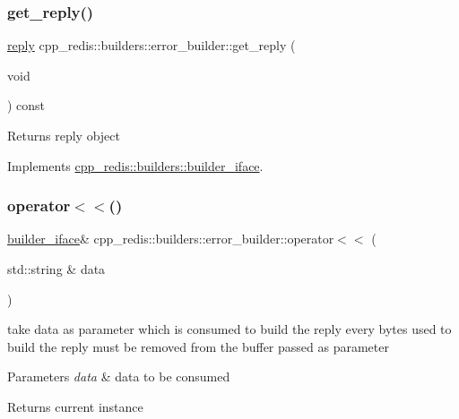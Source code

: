 \subsubsection{\texorpdfstring{get\+\_\+reply()}{get\_reply()}}
{\footnotesize\ttfamily \mbox{\hyperlink{classcpp__redis_1_1reply}{reply}} cpp\+\_\+redis\+::builders\+::error\+\_\+builder\+::get\+\_\+reply (\begin{DoxyParamCaption}\item[{void}]{ }\end{DoxyParamCaption}) const\hspace{0.3cm}{\ttfamily [virtual]}}

\begin{DoxyReturn}{Returns}
reply object 
\end{DoxyReturn}


Implements \mbox{\hyperlink{classcpp__redis_1_1builders_1_1builder__iface_afd2ff2c2371c2a486116543b638b9413}{cpp\+\_\+redis\+::builders\+::builder\+\_\+iface}}.

\mbox{\label{classcpp__redis_1_1builders_1_1error__builder_af5ac542be148d6f8500de79fa3164798}} 
\subsubsection{\texorpdfstring{operator$<$$<$()}{operator<<()}}
{\footnotesize\ttfamily \mbox{\hyperlink{classcpp__redis_1_1builders_1_1builder__iface}{builder\+\_\+iface}}\& cpp\+\_\+redis\+::builders\+::error\+\_\+builder\+::operator$<$$<$ (\begin{DoxyParamCaption}\item[{std\+::string \&}]{data }\end{DoxyParamCaption})\hspace{0.3cm}{\ttfamily [virtual]}}

take data as parameter which is consumed to build the reply every bytes used to build the reply must be removed from the buffer passed as parameter


\begin{DoxyParams}{Parameters}
{\em data} & data to be consumed \\
\hline
\end{DoxyParams}
\begin{DoxyReturn}{Returns}
current instance 
\end{DoxyReturn}


